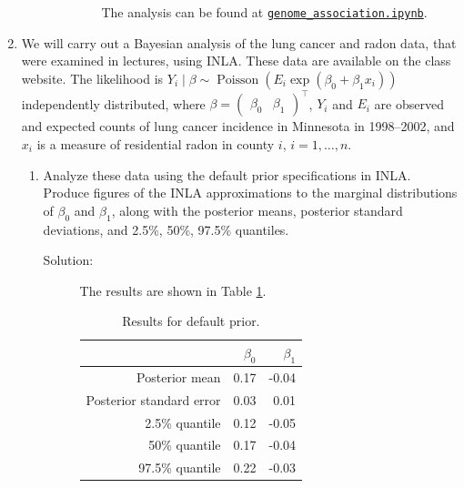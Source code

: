 \documentclass[letterpaper,11pt]{article}
\begin{document}
\begin{enumerate}
\begin{enumerate}
\begin{enumerate}
\begin{description}
        The analysis can be found at
        \href{https://nbviewer.jupyter.org/github/ppham27/stat570/blob/master/hw5/genome\_association.ipynb}{\texttt{genome\_association.ipynb}}.
      \end{description}
    \end{enumerate}
  \end{enumerate}
\item We will carry out a Bayesian analysis of the lung cancer and radon data,
  that were examined in lectures, using INLA. These data are available on the
  class website. The likelihood is
  $Y_i \mid \beta \sim \operatorname{Poisson}\left (E_i\exp\left(\beta_0 +
      \beta_1x_i\right)\right)$ independently distributed, where
  $\beta = \begin{pmatrix}\beta_0 & \beta_1\end{pmatrix}^\intercal$, $Y_i$ and
  $E_i$ are observed and expected counts of lung cancer incidence in Minnesota
  in 1998--2002, and $x_i$ is a measure of residential radon in county $i$,
  $i = 1,\ldots,n$.

  \begin{enumerate}
  \item Analyze these data using the default prior specifications in
    INLA. Produce figures of the INLA approximations to the marginal
    distributions of $\beta_0$ and $\beta_1$, along with the posterior means,
    posterior standard deviations, and 2.5\%, 50\%, 97.5\% quantiles.

    \begin{description}
    \item[Solution:] The results are shown in Table \ref{tab:p3_beta}.
      \begin{table}[ht]
        \centering
        \begin{tabular}{rrr}
          \hline
          & $\beta_0$ & $\beta_1$ \\ 
          \hline
          Posterior mean & 0.17 & -0.04 \\ 
          Posterior standard error & 0.03 & 0.01 \\ 
          2.5\% quantile & 0.12 & -0.05 \\ 
          50\% quantile & 0.17 & -0.04 \\ 
          97.5\% quantile & 0.22 & -0.03 \\ 
          \hline
        \end{tabular}
        \caption{Results for default prior.}
        \label{tab:p3_beta}
      \end{table}
      

\end{description}
\end{enumerate}
\end{enumerate}
\end{document}
